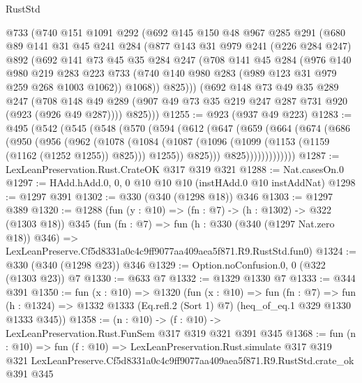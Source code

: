 \begin{lexlean}{RustStd}
\begin{coremodule}
    @733
    (@740
      @151
      @1091
      @292
      (@692
        @145
        @150
        @48
        @967
        @285
        @291
        (@680
          @89
          @141
          @31
          @45
          @241
          @284
          (@877
            @143
            @31
            @979
            @241
            (@226 @284 @247)
            @892
            (@692
              @141
              @73
              @45
              @35
              @284
              @247
              (@708
                @141
                @45
                @284
                (@976
                  @140
                  @980
                  @219
                  @283
                  @223
                  @733
                  (@740 @140 @980 @283 (@989 @123 @31 @979 @259 @268 @1003 @1062))
                  @1068))
              @825)))
        (@692
          @148
          @73
          @49
          @35
          @289
          @247
          (@708 @148 @49 @289 (@907 @49 @73 @35 @219 @247 @287 @731 @920 (@923 (@926 @49 @287))))
          @825)))
@1255 := @923 (@937 @49 @223)
@1283 := @495
    (@542
      (@545
        (@548
          (@570
            (@594
              (@612
                (@647
                  (@659
                    (@664
                      (@674
                        (@686
                          (@950
                            (@956
                              (@962
                                (@1078
                                  (@1084
                                    (@1087
                                      (@1096
                                        (@1099 (@1153 (@1159 (@1162 (@1252 @1255)) @825)))
                                        @1255))
                                    @825)))
                              @825)))))))))))))
@1287 := LexLeanPreservation.Rust.CrateOK @317 @319 @321
@1288 := Nat.casesOn.{0}
@1297 := HAdd.hAdd.{0, 0, 0} @10 @10 @10 (instHAdd.{0} @10 instAddNat)
@1298 := @1297 @391
@1302 := @330 (@340 (@1298 @18)) @346
@1303 := @1297 @389
@1320 := @1288
    (fun (y : @10) => (fn : @7) -> (h : @1302) -> @322 (@1303 @18))
    @345
    (fun (fn : @7) =>
    fun (h : @330 (@340 (@1297 Nat.zero @18)) @346) =>
    LexLeanPreserve.Cf5d8331a0c4c9ff9077aa409aea5f871.R9.RustStd.fun0)
@1324 := @330 (@340 (@1298 @23)) @346
@1329 := Option.noConfusion.{0, 0} (@322 (@1303 @23)) @7
@1330 := @633 @7
@1332 := @1329 @1330 @7
@1333 := @344 @391
@1350 := fun (x : @10) =>
  @1320
    (fun (x : @10) =>
    fun (fn : @7) =>
    fun (h : @1324) => @1332 @1333 (Eq.refl.{2} (Sort 1) @7) (heq_of_eq.{1} @329 @1330 @1333 @345))
@1358 := (n : @10) -> (f : @10) -> LexLeanPreservation.Rust.FunSem @317 @319 @321 @391 @345
@1368 := fun (n : @10) =>
  fun (f : @10) =>
  LexLeanPreservation.Rust.simulate
    @317
    @319
    @321
    LexLeanPreserve.Cf5d8331a0c4c9ff9077aa409aea5f871.R9.RustStd.crate_ok
    @391
    @345
\end{coremodule}
\end{lexlean}
